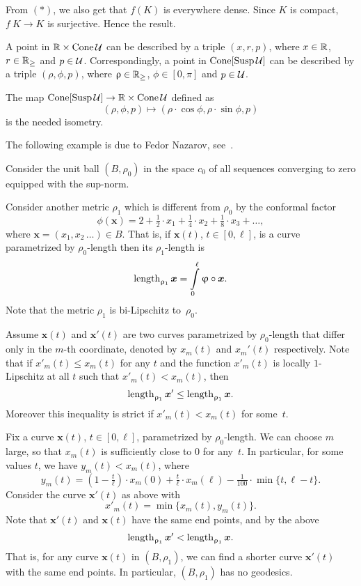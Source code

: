 From $({*})$, we also get that $f(K)$ is everywhere dense.
Since $K$ is compact, $f\:K\to K$ is surjective.
Hence the result.\qeds


 A point in $\RR\times \Cone \spc{U}$ can be described by a triple $(x,r,p)$, where $x\in \RR$, $r\in \RR_{\ge}$ and $p\in \spc{U}$.
Correspondingly, a point in $\mathop{\rm Cone}\nolimits[\mathop{\rm Susp}\nolimits\mathcal{U}]$ can be described by a triple $(\rho,\phi,p)$, where $\rho\in \RR_\ge$, $\phi\in [0,\pi]$ and $p\in \spc{U}$.

The map 
$\Cone[\Susp\spc{U}]\to\RR\times\Cone\spc{U}$ defined as
\[(\rho,\phi,p)\mapsto(\rho\cdot\cos\phi,\rho\cdot\sin\phi,p)\] 
is the needed isometry.\qeds

The following example is due to Fedor Nazarov, see~\cite{nazarov}.

\medskip

Consider the unit ball $(B,\rho_0)$
in the space $c_0$ of all sequences converging to zero equipped with the sup-norm.

Consider another metric $\rho_1$ which is different from $\rho_0$ by the conformal factor
\[\phi(\bm{x})=2+\tfrac{1}2\cdot x_1+\tfrac{1}4\cdot x_2+\tfrac{1}8\cdot x_3+\dots,\]
where $\bm{x}=(x_1,x_2\,\dots)\in B$.
That is, if $\bm{x}(t)$, $t\in[0,\ell]$, is a curve parametrized by $\rho_0$-length 
then its $\rho_1$-length is 
\[\length_{\rho_1}\bm{x}=\int\limits_0^\ell\phi\circ\bm{x}.\]
Note that the metric $\rho_1$ is bi-Lipschitz to~$\rho_0$.

Assume $\bm{x}(t)$ and $\bm{x}'(t)$ are two curves parametrized by $\rho_0$-length that differ only in the $m$-th coordinate, denoted by $x_m(t)$ and $x_m'(t)$ respectively.
Note that if $x'_m(t)\le x_m(t)$ for any $t$ and 
the function $x'_m(t)$ is locally $1$-Lipschitz at all $t$ such that $x'_m(t)< x_m(t)$, then 
\[\length_{\rho_1}\bm{x}'\le \length_{\rho_1}\bm{x}.\]
Moreover this inequality is strict if $x'_m(t)< x_m(t)$ for some~$t$.

Fix a curve $\bm{x}(t)$, $t\in[0,\ell]$, parametrized by  $\rho_0$-length.
We can choose $m$ large, so that $x_m(t)$ is sufficiently close to $0$ for any~$t$.
In particular, for some values $t$, we have $y_m(t)<x_m(t)$, where
\[y_m(t)=(1-\tfrac t\ell)\cdot x_m(0)
+\tfrac t\ell\cdot x_m(\ell)
-\tfrac 1{100}\cdot \min\{t,\ell-t\}.\]
Consider the curve $\bm{x}'(t)$ as above with
\[x'_m(t)=\min\{x_m(t),y_m(t)\}.\]
Note that $\bm{x}'(t)$ and $\bm{x}(t)$ have the same end points, and by the above
\[\mathop{\rm length}\nolimits_{\upvarrho_1}\bm{x}'<\mathop{\rm length}\nolimits_{\upvarrho_1}\bm{x}.\]
That is, for any curve $\bm{x}(t)$ in $(B,\rho_1)$, we can find a shorter curve $\bm{x}'(t)$ with the same end points.
In particular, $(B,\rho_1)$ has no geodesics.
\qeds

